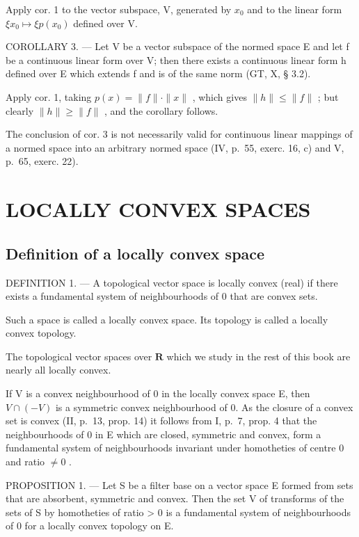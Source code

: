 Apply cor. 1 to the vector subspace, V, generated by \(x_0\) and to the linear form \(\xi x_0 \mapsto \xi p(x_0)\) defined over V.

COROLLARY 3. --- Let V be a vector subspace of the normed space E and let f be a continuous linear form over V; then there exists a continuous linear form h defined over E which extends f and is of the same norm (GT, X, § 3.2).

Apply cor. 1, taking \(p(x) = \| f \| \cdot \| x \|\) , which gives \(\| h \| \leqslant \| f \|\) ; but clearly \(\| h \| \geqslant \| f \|\) , and the corollary follows.

The conclusion of cor. 3 is not necessarily valid for continuous linear mappings of a normed space into an arbitrary normed space (IV, p.~55, exerc. 16, c) and V, p.~65, exerc. 22).

\section{LOCALLY CONVEX SPACES}

\subsection{Definition of a locally convex space}

DEFINITION 1. --- A topological vector space is locally convex (real) if there exists a fundamental system of neighbourhoods of 0 that are convex sets.

Such a space is called a locally convex space. Its topology is called a locally convex topology.

The topological vector spaces over \(\mathbf{R}\) which we study in the rest of this book are nearly all locally convex.

If V is a convex neighbourhood of 0 in the locally convex space E, then \(V \cap (-V)\) is a symmetric convex neighbourhood of 0. As the closure of a convex set is convex (II, p.~13, prop. 14) it follows from I, p.~7, prop. 4 that the neighbourhoods of 0 in E which are closed, symmetric and convex, form a fundamental system of neighbourhoods invariant under homotheties of centre 0 and ratio \(\neq 0\) .

PROPOSITION 1. --- Let S be a filter base on a vector space E formed from sets that are absorbent, symmetric and convex. Then the set V of transforms of the sets of S by homotheties of ratio \textgreater{} 0 is a fundamental system of neighbourhoods of 0 for a locally convex topology on E.

